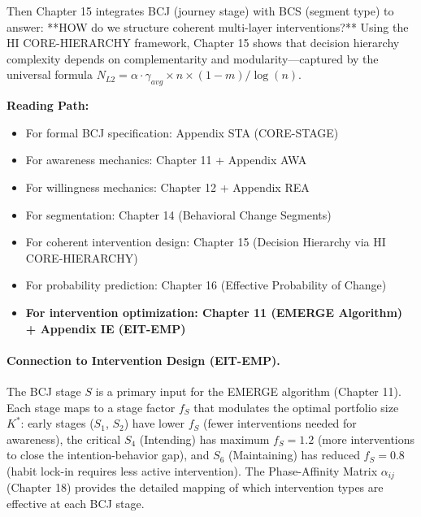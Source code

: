 Then Chapter 15 integrates BCJ (journey stage) with BCS (segment type) to answer:
**HOW do we structure coherent multi-layer interventions?** Using the HI CORE-HIERARCHY
framework, Chapter 15 shows that decision hierarchy complexity depends on complementarity
and modularity---captured by the universal formula $N_{L2} = \alpha \cdot \gamma_{avg} \times n \times (1-m) / \log(n)$.

\begin{cross-reference}
\textbf{Reading Path:}
\begin{itemize}
    \item For formal BCJ specification: Appendix STA (CORE-STAGE)
    \item For awareness mechanics: Chapter 11 + Appendix AWA
    \item For willingness mechanics: Chapter 12 + Appendix REA
    \item For segmentation: Chapter 14 (Behavioral Change Segments)
    \item For coherent intervention design: Chapter 15 (Decision Hierarchy via HI CORE-HIERARCHY)
    \item For probability prediction: Chapter 16 (Effective Probability of Change)
    \item \textbf{For intervention optimization: Chapter 11 (EMERGE Algorithm) + Appendix IE (EIT-EMP)}
\end{itemize}
\end{cross-reference}

\paragraph{Connection to Intervention Design (EIT-EMP).}
The BCJ stage $S$ is a primary input for the EMERGE algorithm (Chapter 11). Each stage
maps to a stage factor $f_S$ that modulates the optimal portfolio size $K^*$: early stages
($S_1$, $S_2$) have lower $f_S$ (fewer interventions needed for awareness), the critical
$S_4$ (Intending) has maximum $f_S = 1.2$ (more interventions to close the intention-behavior gap),
and $S_6$ (Maintaining) has reduced $f_S = 0.8$ (habit lock-in requires less active intervention).
The Phase-Affinity Matrix $\alpha_{ij}$ (Chapter 18) provides the detailed mapping of which
intervention types are effective at each BCJ stage.

